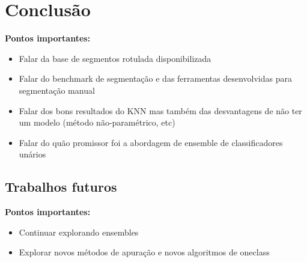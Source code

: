\chapter{Conclusão}\label{cap:conclusao}





\textbf{Pontos importantes:}
\begin{itemize}
	\item Falar da base de segmentos rotulada disponibilizada
	\item Falar do benchmark de segmentação e das ferramentas desenvolvidas para segmentação manual
	\item Falar dos bons resultados do KNN mas também das desvantagens de não ter um modelo (método não-paramétrico, etc)
	\item Falar do quão promissor foi a abordagem de ensemble de classificadores unários
\end{itemize}

\section{Trabalhos futuros}

\textbf{Pontos importantes:}
\begin{itemize}
	\item Continuar explorando ensembles
	\item Explorar novos métodos de apuração e novos algoritmos de oneclass
\end{itemize}
